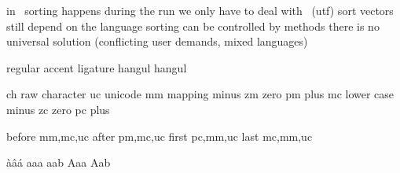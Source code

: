 \StartSteps
\startitemize
\startitem in \MKIV\ sorting happens during the run \stopitem \FlushStep
\startitem we only have to deal with \UNICODE\ (utf) \stopitem \FlushStep
\startitem sort vectors still depend on the language \stopitem \FlushStep
\startitem sorting can be controlled by methods \stopitem \FlushStep
\startitem there is no universal solution (conflicting user demands, mixed languages) \stopitem \FlushStep
\stopitemize
\StopSteps


\setupTABLE[background=color,backgroundcolor=lightgray,rulethickness=.75bp,framecolor=darkgray]

\StartSteps
{}            {regular\FlushStep}
    {}            {accent\FlushStep}
    {}            {ligature\FlushStep}
    {} {hangul\FlushStep}
    {} {hangul\FlushStep}
\stopcombination
\StopSteps


\StartSteps
\starttabulate[|l|l|r|]
    \NC ch \NC raw character \NC       \FlushStep \NC \NR
    \NC uc \NC unicode       \NC       \FlushStep \NC \NR
    \NC mm \NC mapping       \NC minus \FlushStep \NC \NR
    \NC zm \NC               \NC zero  \FlushStep \NC \NR
    \NC pm \NC               \NC plus  \FlushStep \NC \NR
    \NC mc \NC lower case    \NC minus \FlushStep \NC \NR
    \NC zc \NC               \NC zero  \FlushStep \NC \NR
    \NC pc \NC               \NC plus  \FlushStep \NC \NR
\stoptabulate
\StopSteps


\StartSteps
\starttabulate[|l|l|]
    \NC before \NC mm,mc,uc \NC \NR
    \NC after  \NC pm,mc,uc \NC \NR
    \NC first  \NC pc,mm,uc \NC \NR
    \NC last   \NC mc,mm,uc \NC \NR
\stoptabulate

\FlushStep

\starttyping
{}
\stoptyping

\FlushStep
\StopSteps


\startbuffer
àâá
aaa
aab
Aaa
Aab
\stopbuffer

\StartSteps
\typebuffer \FlushStep

